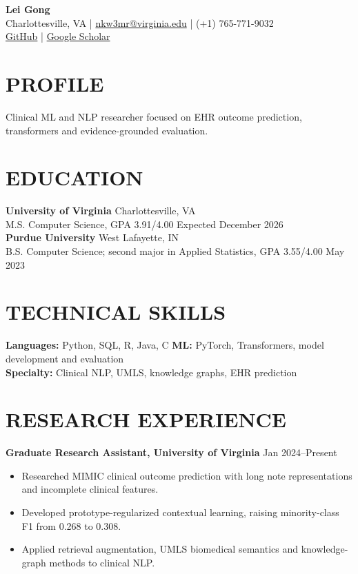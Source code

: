 \documentclass[10pt, letterpaper]{article}
\begin{document}
\setlength{\parindent}{0pt}
\begin{center}
{\fontsize{23}{25}\selectfont\textbf{Lei Gong}}\\[3pt]
Charlottesville, VA \quad | \quad \href{mailto:nkw3mr@virginia.edu}{nkw3mr@virginia.edu} \quad | \quad (+1) 765-771-9032\\[2pt]
\href{https://github.com/LeiGong0125Carrot}{GitHub} \quad | \quad \href{https://scholar.google.com/citations?user=8QLAkKMAAAAJ}{Google Scholar}
\end{center}
\vspace{-3mm}
\section{PROFILE}
Clinical ML and NLP researcher focused on EHR outcome prediction, transformers and evidence-grounded evaluation.
\section{EDUCATION}
\textbf{University of Virginia} \hfill Charlottesville, VA \\
M.S. Computer Science, GPA 3.91/4.00 \hfill Expected December 2026\\[1pt]
\textbf{Purdue University} \hfill West Lafayette, IN \\
B.S. Computer Science; second major in Applied Statistics, GPA 3.55/4.00 \hfill May 2023
\section{TECHNICAL SKILLS}
\textbf{Languages:} Python, SQL, R, Java, C \quad \textbf{ML:} PyTorch, Transformers, model development and evaluation\\
\textbf{Specialty:} Clinical NLP, UMLS, knowledge graphs, EHR prediction
\section{RESEARCH EXPERIENCE}
\textbf{Graduate Research Assistant, University of Virginia} \hfill Jan 2024--Present
\begin{itemize}
\item Researched MIMIC clinical outcome prediction with long note representations and incomplete clinical features.
\item Developed prototype-regularized contextual learning, raising minority-class F1 from 0.268 to 0.308.
\item Applied retrieval augmentation, UMLS biomedical semantics and knowledge-graph methods to clinical NLP.
\end{itemize}
\end{document}
